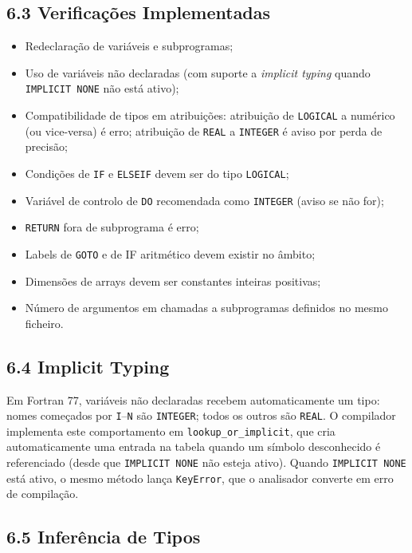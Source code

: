 \documentclass[a4paper]{article}
\begin{document}
\subsection*{6.3 Verificações Implementadas}

\begin{itemize}
    \item Redeclaração de variáveis e subprogramas;
    \item Uso de variáveis não declaradas (com suporte a \textit{implicit typing} quando \texttt{IMPLICIT NONE} não está ativo);
    \item Compatibilidade de tipos em atribuições: atribuição de \texttt{LOGICAL} a numérico (ou vice-versa) é erro; atribuição de \texttt{REAL} a \texttt{INTEGER} é aviso por perda de precisão;
    \item Condições de \texttt{IF} e \texttt{ELSEIF} devem ser do tipo \texttt{LOGICAL};
    \item Variável de controlo de \texttt{DO} recomendada como \texttt{INTEGER} (aviso se não for);
    \item \texttt{RETURN} fora de subprograma é erro;
    \item Labels de \texttt{GOTO} e de IF aritmético devem existir no âmbito;
    \item Dimensões de arrays devem ser constantes inteiras positivas;
    \item Número de argumentos em chamadas a subprogramas definidos no mesmo ficheiro.
\end{itemize}

\subsection*{6.4 Implicit Typing}

\noindent Em Fortran 77, variáveis não declaradas recebem automaticamente um tipo: nomes começados por \texttt{I}--\texttt{N} são \texttt{INTEGER}; todos os outros são \texttt{REAL}. O compilador implementa este comportamento em \texttt{lookup\_or\_implicit}, que cria automaticamente uma entrada na tabela quando um símbolo desconhecido é referenciado (desde que \texttt{IMPLICIT NONE} não esteja ativo). Quando \texttt{IMPLICIT NONE} está ativo, o mesmo método lança \texttt{KeyError}, que o analisador converte em erro de compilação.

\subsection*{6.5 Inferência de Tipos}
\end{document}
